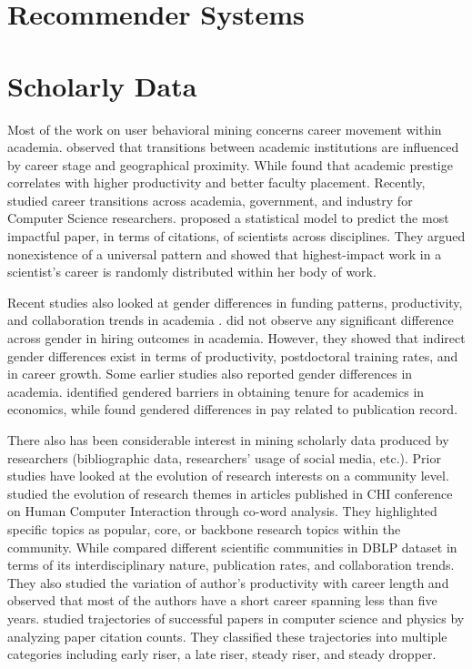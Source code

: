 \section{Recommender Systems}


\section{Scholarly Data}
Most of the work on user behavioral mining concerns career movement within academia. \citet{deville:2014} observed that transitions between academic institutions are influenced by career stage and geographical proximity. While \citet{clauset:2015} found that academic prestige correlates with higher productivity and better faculty placement. Recently, \citet{Danai:2018} studied career transitions across academia, government, and industry for Computer Science researchers. \citet{dashun:2013} proposed a statistical model to predict the most impactful paper, in terms of citations, of scientists across disciplines. They argued nonexistence of a universal pattern and showed that highest-impact work in a scientist's career is randomly distributed within her body of work.

Recent studies also looked at gender differences in funding patterns, productivity, and collaboration trends in academia \citep{Way:2016, Way:2017}. \citet{Way:2016} did not observe any significant difference across gender in hiring outcomes in academia. However, they showed that indirect gender differences exist in terms of productivity, postdoctoral training rates, and in career growth. Some earlier studies also reported gender differences in academia. \citet{Kahn:1993} identified gendered barriers in obtaining tenure for academics in economics, while \citet{Ward:2001} found gendered differences in pay related to publication record.

There also has been considerable interest in mining scholarly data produced by researchers (bibliographic data, researchers' usage of social media, etc.). Prior studies have looked at the evolution of research interests on a community level. \citet{liu2014chi} studied the evolution of research themes in articles published in CHI conference on Human Computer Interaction through co-word analysis. They highlighted specific topics as popular, core, or backbone research topics within the community. While \citet{Biryukov:2010} compared different scientific communities in DBLP dataset in terms of its interdisciplinary nature, publication rates, and collaboration trends. They also studied the variation of author's productivity with career length and observed that most of the authors have a short career spanning less than five years. \citet{Chakraborty:2018} studied trajectories of successful papers in computer science and physics by analyzing paper citation counts. They classified these trajectories into multiple categories including early riser, a late riser, steady riser, and steady dropper.

